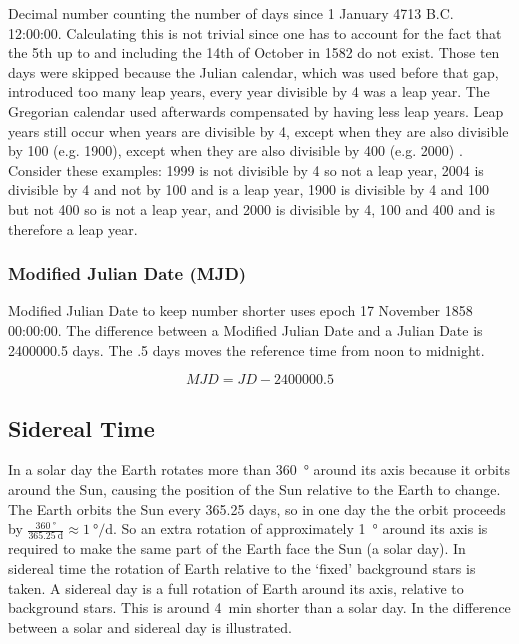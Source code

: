 Decimal number counting the number of days since 1 January 4713 B.C.
12:00:00. Calculating this is not trivial since one has to account for
the fact that the 5th up to and including the 14th of October in 1582 do
not exist. Those ten days were skipped because the Julian calendar,
which was used before that gap, introduced too many leap years, every
year divisible by 4 was a leap year. The Gregorian calendar used
afterwards compensated by having less leap years. Leap years still occur
when years are divisible by 4, except when they are also divisible by
100 (e.g. 1900), except when they are also divisible by 400 (e.g. 2000)
\cite{acf:2014aa}. Consider these examples: 1999 is not divisible by 4
so not a leap year, 2004 is divisible by 4 and not by 100 and is a leap
year, 1900 is divisible by 4 and 100 but not 400 so is not a leap year,
and 2000 is divisible by 4, 100 and 400 and is therefore a leap year.


\subsubsection{Modified Julian Date (MJD)}

Modified Julian Date to keep number shorter uses epoch 17 November 1858
00:00:00. The difference between a Modified Julian Date and a Julian
Date is 2400000.5 days. The .5 days moves the reference time from noon
to midnight.

\begin{equation}
    MJD = JD - 2400000.5
\end{equation}


\subsection{Sidereal Time}

In a solar day the Earth rotates more than \SI{360}{\degree} around its
axis because it orbits around the Sun, causing the position of the Sun
relative to the Earth to change. The Earth orbits the Sun every 365.25
days, so in one day the the orbit proceeds by
$\frac{\SI{360}{\degree}}{\SI{365.25}{\day}} \approx
\SI{1}{\degree\per\day}$. So an extra rotation of approximately
\SI{1}{\degree} around its axis is required to make the same part of the
Earth face the Sun (a solar day). In sidereal time the rotation of Earth
relative to the `fixed' background stars is taken. A sidereal day is a
full rotation of Earth around its axis, relative to background stars.
This is around \SI{4}{\minute} shorter than a solar day. In
 the difference between a solar and sidereal
day is illustrated.


